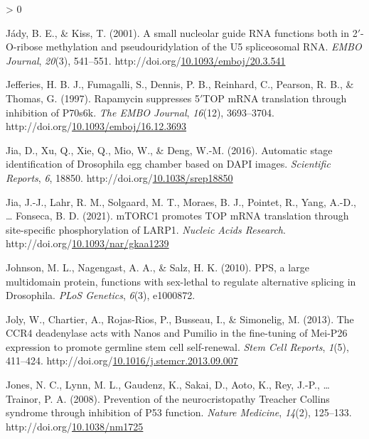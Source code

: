\documentclass[12pt,oneside]{reedthesis}
\newlength{\cslhangindent}
\newenvironment{CSLReferences}[2] %
 {%
  \setlength{\parindent}{0pt}
  \ifodd #1 \everypar{\setlength{\hangindent}{\cslhangindent}}\ignorespaces\fi
  \ifnum #2 > 0
  \setlength{\parskip}{#2\baselineskip}
  \fi
 }%
 {}
\begin{document}
\begin{CSLReferences}{1}{0}
\leavevmode\hypertarget{ref-Jady2001c}{}%
Jády, B. E., \& Kiss, T. (2001). A small nucleolar guide {RNA} functions both in 2{\({'}\)}-{O}-ribose methylation and pseudouridylation of the {U5} spliceosomal {RNA}. \emph{EMBO Journal}, \emph{20}(3), 541--551. http://doi.org/\href{https://doi.org/10.1093/emboj/20.3.541}{10.1093/emboj/20.3.541}

\leavevmode\hypertarget{ref-jefferiesRapamycinSuppressesTOP1997}{}%
Jefferies, H. B. J., Fumagalli, S., Dennis, P. B., Reinhard, C., Pearson, R. B., \& Thomas, G. (1997). Rapamycin suppresses 5{\({'}\)}{TOP mRNA} translation through inhibition of P70s6k. \emph{The EMBO Journal}, \emph{16}(12), 3693--3704. http://doi.org/\href{https://doi.org/10.1093/emboj/16.12.3693}{10.1093/emboj/16.12.3693}

\leavevmode\hypertarget{ref-Jia2016b}{}%
Jia, D., Xu, Q., Xie, Q., Mio, W., \& Deng, W.-M. (2016). Automatic stage identification of {Drosophila} egg chamber based on {DAPI} images. \emph{Scientific Reports}, \emph{6}, 18850. http://doi.org/\href{https://doi.org/10.1038/srep18850}{10.1038/srep18850}

\leavevmode\hypertarget{ref-jiaMTORC1PromotesTOP2021}{}%
Jia, J.-J., Lahr, R. M., Solgaard, M. T., Moraes, B. J., Pointet, R., Yang, A.-D., \ldots{} Fonseca, B. D. (2021). {mTORC1} promotes {TOP mRNA} translation through site-specific phosphorylation of {LARP1}. \emph{Nucleic Acids Research}. http://doi.org/\href{https://doi.org/10.1093/nar/gkaa1239}{10.1093/nar/gkaa1239}

\leavevmode\hypertarget{ref-Johnson2010}{}%
Johnson, M. L., Nagengast, A. A., \& Salz, H. K. (2010). {PPS}, a large multidomain protein, functions with sex-lethal to regulate alternative splicing in {Drosophila}. \emph{PLoS Genetics}, \emph{6}(3), e1000872.

\leavevmode\hypertarget{ref-Joly2013f}{}%
Joly, W., Chartier, A., Rojas-Rios, P., Busseau, I., \& Simonelig, M. (2013). The {CCR4} deadenylase acts with {Nanos} and {Pumilio} in the fine-tuning of {Mei}-{P26} expression to promote germline stem cell self-renewal. \emph{Stem Cell Reports}, \emph{1}(5), 411--424. http://doi.org/\href{https://doi.org/10.1016/j.stemcr.2013.09.007}{10.1016/j.stemcr.2013.09.007}

\leavevmode\hypertarget{ref-jonesPreventionNeurocristopathyTreacher2008}{}%
Jones, N. C., Lynn, M. L., Gaudenz, K., Sakai, D., Aoto, K., Rey, J.-P., \ldots{} Trainor, P. A. (2008). Prevention of the neurocristopathy {Treacher Collins} syndrome through inhibition of P53 function. \emph{Nature Medicine}, \emph{14}(2), 125--133. http://doi.org/\href{https://doi.org/10.1038/nm1725}{10.1038/nm1725}


\end{CSLReferences}
\end{document}

